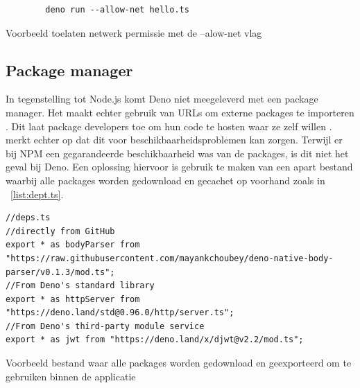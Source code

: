 \begin{listing}[H]
    \centering
    \begin{verbatim}
        deno run --allow-net hello.ts
        \end{verbatim}
        \caption[Toelaten netwerk permissie]{\label{fig:denocli}Voorbeeld toelaten netwerk permissie met de --alow-net vlag \autocite{DenoLand2023}}
\end{listing}

\subsection{Package manager}
In tegenstelling tot Node.js komt Deno niet meegeleverd met een package manager. 
Het maakt echter gebruik van URLs om externe packages te importeren \autocite{DenoLand2023}.
Dit laat package developers toe om hun code te hosten waar ze zelf willen \autocite{Barrow2022}.
\textcite{Choubey2021} merkt echter op dat dit voor beschikbaarheidsproblemen kan zorgen. 
Terwijl er bij NPM een gegarandeerde beschikbaarheid was van de packages, is dit niet het geval bij Deno.
Een oplossing hiervoor is gebruik te maken van een apart bestand waarbij alle packages worden gedownload en gecachet op voorhand zoals in ~\ref{list:dept.ts}.
\begin{listing}[H]
    \centering
    \begin{verbatim}
//deps.ts
//directly from GitHub
export * as bodyParser from "https://raw.githubusercontent.com/mayankchoubey/deno-native-body-parser/v0.1.3/mod.ts";
//From Deno's standard library
export * as httpServer from "https://deno.land/std@0.96.0/http/server.ts";
//From Deno's third-party module service
export * as jwt from "https://deno.land/x/djwt@v2.2/mod.ts";
        \end{verbatim}
        \caption[Deno packages downloaden]{\label{list:dept.ts}Voorbeeld bestand waar alle packages worden gedownload en geexporteerd om te gebruiken binnen de applicatie  ~\autocite{Choubey2021}} 
\end{listing}

